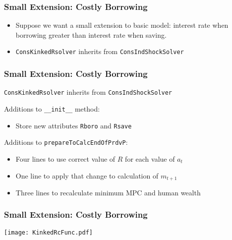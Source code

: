 \documentclass[11ptt]{beamer}
\begin{document}
\begin{frame}
\frametitle{Small Extension: Costly Borrowing}
\begin{itemize}
\item Suppose we want a small extension to basic model: interest rate when borrowing greater than interest rate when saving.

\item \texttt{ConsKinkedRsolver} inherits from \texttt{ConsIndShockSolver}
\end{itemize}

\end{frame}


\begin{frame}
\frametitle{Small Extension: Costly Borrowing}
\texttt{ConsKinkedRsolver} inherits from \texttt{ConsIndShockSolver}

\begin{block}{Additions to \texttt{\_\_init\_\_} method:}
\begin{itemize}
\item Store new attributes \texttt{Rboro} and \texttt{Rsave}
\end{itemize}
\end{block}

\begin{block}{Additions to \texttt{prepareToCalcEndOfPrdvP}:}
\begin{itemize}
\item Four lines to use correct value of $R$ for each value of $a_t$

\item One line to apply that change to calculation of $m_{t+1}$

\item Three lines to recalculate minimum MPC and human wealth
\end{itemize}
\end{block}
\end{frame}


\begin{frame}
\frametitle{Small Extension: Costly Borrowing}
\begin{center}
\texttt{[image: KinkedRcFunc.pdf]}
\end{center}
\end{frame}
\end{document}
